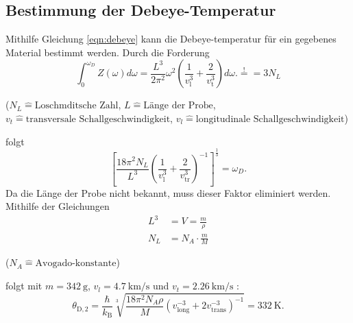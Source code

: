\subsection{Bestimmung der Debeye-Temperatur}
Mithilfe Gleichung \ref{eqn:debeye} kann die Debeye-temperatur für ein gegebenes Material bestimmt werden. 
Durch die Forderung
\begin{equation}
	\int_0^{\omega_D} Z(\omega)d\omega = \frac{L^3}{2\pi^2}\omega^2\left(\frac{1}{v_\text{l}^3}+\frac{2}{v_{\text{t}}^3}\right)d\omega. \overset{!}{=} = 3 N_L
	\label{eqn:z}
\end{equation}
\begin{center}
    \tiny{($N_L \hat{=} \text{Loschmditsche Zahl}$, $L \hat{=} \text{Länge der Probe}$, $v_t \hat{=} \text{transversale Schallgeschwindigkeit}$, $v_l \hat{=} \text{longitudinale Schallgeschwindigkeit}$)}
\end{center}
folgt 
\begin{equation}
    \left[\frac{18\pi^2N_L}{L^3}\left(\frac{1}{v_\text{l}^3}+\frac{2}{v_\text{tr}^3}\right)^{-1} \right]^{\frac{1}{3}} = \omega_D.
\end{equation}
Da die Länge der Probe nicht bekannt, muss dieser Faktor eliminiert werden. Mithilfe der Gleichungen
\begin{align}
    L^3 &= V = \frac{m}{\rho} \\
    N_L &= N_A \cdot \frac{m}{M}
\end{align}
\begin{center}
    \tiny{($N_A \hat{=} \text{Avogado-konstante}$)}
\end{center}
folgt mit $m = \SI{342}{\gram} $, $v_l = \SI{4,7}{\kilo \meter \per \second} $ und $v_t = \SI{2,26}{\kilo \meter \per \second}$ :
\begin{equation}
    \theta_{\mathrm{D},2}=\frac{\hbar}{k_{\mathrm{B}}}\sqrt[3]{\frac{18\pi^2N_A\rho}{M}\left(v_{\mathrm{long}}^{-3}+2v_{\mathrm{trans}}^{-3}\right)^{-1}}=\SI{332}{\kelvin}. 
\end{equation}

